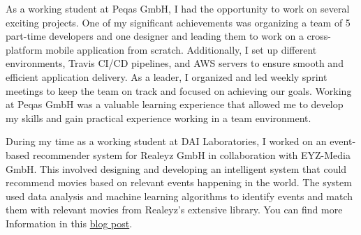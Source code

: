 \documentclass[10pt,a4paper]{altacv}
\begin{document}
\begin{itemize}
\begin{fullwidth}
\newpage

As a working student at Peqas GmbH, I had the opportunity to work on several exciting projects. One of my significant achievements was organizing a team of 5 part-time developers and one designer and leading them to work on a cross-platform mobile application from scratch. Additionally, I set up different environments, Travis CI/CD pipelines, and AWS servers to ensure smooth and efficient application delivery. As a leader, I organized and led weekly sprint meetings to keep the team on track and focused on achieving our goals. Working at Peqas GmbH was a valuable learning experience that allowed me to develop my skills and gain practical experience working in a team environment.
\newline
\newline



\divider

During my time as a working student at DAI Laboratories, I worked on an event-based recommender system for Realeyz GmbH in collaboration with EYZ-Media GmbH. This involved designing and developing an intelligent system that could recommend movies based on relevant events happening in the world. The system used data analysis and machine learning algorithms to identify events and match them with relevant movies from Realeyz's extensive library.
You can find more Information in this \href{https://eyzmedia.de/en/event-based-approach/}{blog post}.
\newline

\newline


\end{fullwidth}








\end{itemize}
\end{document}
